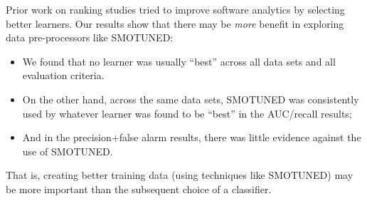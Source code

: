 \documentclass[10pt,conference]{IEEEtran}
\newcommand{\bi}{\begin{itemize}[leftmargin=0.4cm]}
\newcommand{\ei}{\end{itemize}}
\theoremstyle{break}
\theoremstyle{break}
\newcommand{\smb}{{\sc SMOTUNED}}
\begin{document}








Prior work on ranking studies tried to improve software analytics by selecting better learners.
Our results show that there may be {\em more} benefit in exploring data pre-processors like {\smb}:
\bi
\item
We found  that no  learner  was  usually  
``best''  
across all  data  sets  and  all  evaluation  criteria. 
\item 
On the other hand, across the same data sets,
{\smb} was  consistently  used  by  whatever  learner  was  found  to  be ``best'' in the  AUC/recall results;
\item
And in the precision+false alarm results, there was little evidence against the use of {\smb}.
\ei
That is, creating better training data  (using techniques like {\smb}) may be  more important than  the  subsequent  choice  of a classifier.
\end{document}
